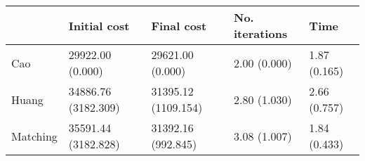 \begin{tabular}{lllll}
\toprule
{} &         Initial cost &           Final cost & No. iterations &          Time \\
\midrule
Cao      &     29922.00 (0.000) &     29621.00 (0.000) &   2.00 (0.000) &  1.87 (0.165) \\
Huang    &  34886.76 (3182.309) &  31395.12 (1109.154) &   2.80 (1.030) &  2.66 (0.757) \\
Matching &  35591.44 (3182.828) &   31392.16 (992.845) &   3.08 (1.007) &  1.84 (0.433) \\
\bottomrule
\end{tabular}
